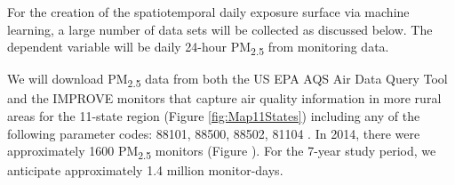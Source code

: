 \documentclass[authoryear]{elsarticle}
\begin{document}

For the creation of the spatiotemporal daily exposure surface via machine learning, a large number of data sets will be collected as discussed below. The dependent variable will be daily 24-hour PM\textsubscript{2.5} from monitoring data.  

We will download PM\textsubscript{2.5} data from both the US EPA AQS Air Data Query Tool 
\citep{EPAAirData2017} and the IMPROVE monitors that capture air quality information in 
more rural areas \citep{EPANPM25IMPROVE2017} for the 11-state region (Figure \ref{fig:Map11States}) including any of the following parameter codes: 88101, 88500, 88502, 81104 \citep{EPANPM25Memo2017,EPANPM25Parameters2017,EPANAllParameters2017}. In 2014, there were approximately 1600 PM\textsubscript{2.5} monitors (Figure %
). For the 7-year study period, we anticipate approximately 1.4 million monitor-days. 
\end{document}
